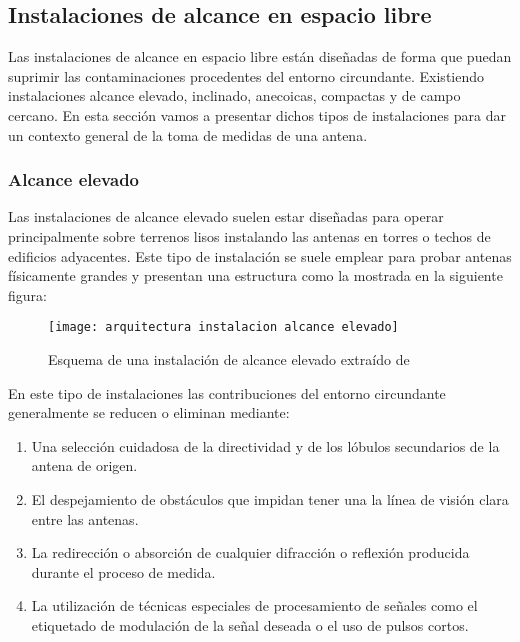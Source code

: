 \subsection{Instalaciones de alcance en espacio libre}

Las instalaciones de alcance en espacio libre están diseñadas de forma que puedan suprimir las contaminaciones procedentes del entorno circundante. Existiendo instalaciones alcance elevado, inclinado, anecoicas, compactas y de campo cercano. En esta sección vamos a presentar dichos tipos de instalaciones para dar un contexto general de la toma de medidas de una antena.

\subsubsection{Alcance elevado}

Las instalaciones de alcance elevado suelen estar diseñadas para operar principalmente sobre terrenos lisos instalando las antenas en torres o techos de edificios adyacentes. Este tipo de instalación se suele emplear para probar antenas físicamente grandes y presentan una estructura como la mostrada en la siguiente figura:

\begin{figure}[h] 
  \centering
    \texttt{[image: arquitectura instalacion alcance elevado]}
    \caption{Esquema de una instalación de alcance elevado extraído de \cite{Balanis_2016}}
    \label{Esquema de una instalación de alcance elevado}
\end{figure}

\newpage

En este tipo de instalaciones las contribuciones del entorno circundante generalmente se reducen o eliminan mediante:

\begin{enumerate}
    \item Una selección cuidadosa de la directividad y de los lóbulos secundarios de la antena de origen.

    \item El despejamiento de obstáculos que impidan tener una la línea de visión clara entre las antenas.

    \item La redirección o absorción de cualquier difracción o reflexión producida durante el proceso de medida.

    \item La utilización de técnicas especiales de procesamiento de señales como el etiquetado de modulación de la señal deseada o el uso de pulsos cortos.
\end{enumerate}

